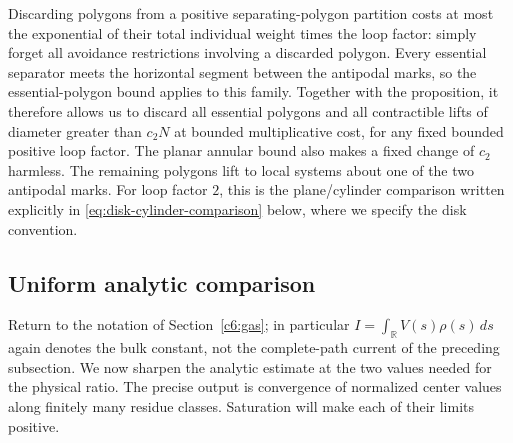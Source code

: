 Discarding polygons from a positive separating-polygon partition costs at most the exponential of their total individual weight times the loop factor: simply forget all avoidance restrictions involving a discarded polygon. Every essential separator meets the horizontal segment between the antipodal marks, so the essential-polygon bound applies to this family. Together with the proposition, it therefore allows us to discard all essential polygons and all contractible lifts of diameter greater than $c_2N$ at bounded multiplicative cost, for any fixed bounded positive loop factor. The planar annular bound also makes a fixed change of $c_2$ harmless. The remaining polygons lift to local systems about one of the two antipodal marks. For loop factor $2$, this is the plane/cylinder comparison written explicitly in \eqref{eq:disk-cylinder-comparison} below, where we specify the disk convention.

\subsection{Uniform analytic comparison}\label{c6:uniform-analytic}

Return to the notation of Section~\ref{c6:gas}; in particular $I=\int_{\mathbb R}V(s)\rho(s)\,ds$ again denotes the bulk constant, not the complete-path current of the preceding subsection. We now sharpen the analytic estimate at the two values needed for the physical ratio. The precise output is convergence of normalized center values along finitely many residue classes. Saturation will make each of their limits positive.

